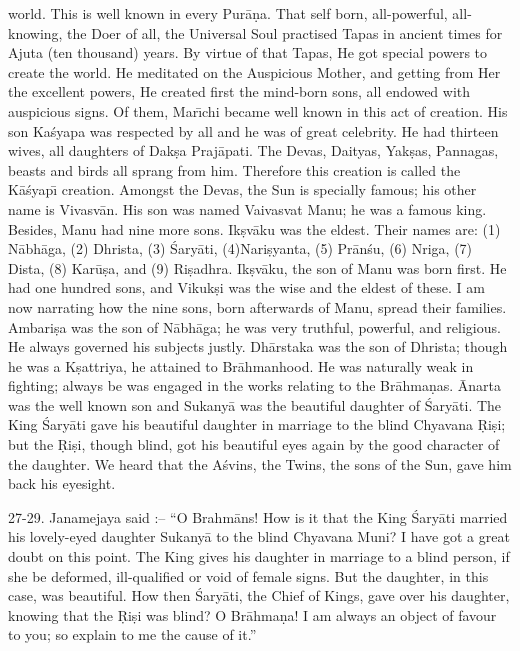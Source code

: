 world. This is well known in every Pur\=a\d{n}a. That self born, all-powerful, all-knowing, the Doer of all, the Universal Soul practised Tapas in ancient times for Ajuta (ten thousand) years. By virtue of that Tapas, He got special powers to create the world. He meditated on the Auspicious Mother, and getting from Her the excellent powers, He created first the mind-born sons, all endowed with auspicious signs. Of them, Mar\={\i}chi became well known in this act of creation. His son Ka\'syapa was respected by all and he was of great celebrity. He had thirteen wives, all daughters of Dak\d{s}a Praj\=apati. The Devas, Daityas, Yak\d{s}as, Pannagas, beasts and birds all sprang from him. Therefore this creation is called the K\=a\'syap\={\i} creation. Amongst the Devas, the Sun is specially famous; his other name is Vivasv\=an. His son was named Vaivasvat Manu; he was a famous king. Besides, Manu had nine more sons. Ik\d{s}v\=aku was the eldest. Their names are: (1) N\=abh\=aga, (2) Dhrista, (3) \'Sary\=ati, (4)Nari\d{s}yanta, (5) Pr\=an\'su, (6) Nriga, (7) Dista, (8) Kar\=u\d{s}a, and (9) Ri\d{s}adhra. Ik\d{s}v\=aku, the son of Manu was born first. He had one hundred sons, and Vikuk\d{s}i was the wise and the eldest of these. I am now narrating how the nine sons, born afterwards of Manu, spread their families. Ambari\d{s}a was the son of N\=abh\=aga; he was very truthful, powerful, and religious. He always governed his subjects justly. Dh\=arstaka was the son of Dhrista; though he was a K\d{s}attriya, he attained to Br\=ahmanhood. He was naturally weak in fighting; always be was engaged in the works relating to the Br\=ahma\d{n}as. \=Anarta was the well known son and Sukany\=a was the beautiful daughter of \'Sary\=ati. The King \'Sary\=ati gave his beautiful daughter in marriage to the blind Chyavana \d{R}i\d{s}i; but the \d{R}i\d{s}i, though blind, got his beautiful eyes again by the good character of the daughter. We heard that the A\'svins, the Twins, the sons of the Sun, gave him back his eyesight.

27-29. Janamejaya said :-- ``O Brahm\=ans! How is it that the King \'Sary\=ati married his lovely-eyed daughter Sukany\=a to the blind Chyavana Muni? I have got a great doubt on this point. The King gives his daughter in marriage to a blind person, if she be deformed, ill-qualified or void of female signs. But the daughter, in this case, was beautiful. How then \'Sary\=ati, the Chief of Kings, gave over his daughter, knowing that the \d{R}i\d{s}i was blind? O Br\=ahma\d{n}a! I am always an object of favour to you; so explain to me the cause of it.''

